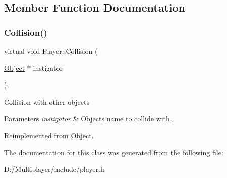 \subsection{Member Function Documentation}
\mbox{\label{class_player_ac2e2422e1637707ed0a032f17392b16b}} 
\subsubsection{\texorpdfstring{Collision()}{Collision()}}
{\footnotesize\ttfamily virtual void Player\+::\+Collision (\begin{DoxyParamCaption}\item[{\hyperlink{class_object}{Object} $\ast$}]{instigator }\end{DoxyParamCaption})\hspace{0.3cm}{\ttfamily [override]}, {\ttfamily [virtual]}}

Collision with other objects 
\begin{DoxyParams}{Parameters}
{\em instigator} & Objects name to collide with. \\
\hline
\end{DoxyParams}


Reimplemented from \hyperlink{class_object_a0af60ea226dcb885e69483452d34a47a}{Object}.



The documentation for this class was generated from the following file\+:\begin{DoxyCompactItemize}
\item 
D\+:/\+Multiplayer/include/player.\+h\end{DoxyCompactItemize}
